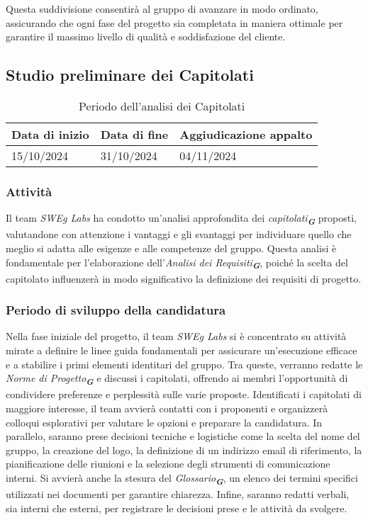 Questa suddivisione consentirà al gruppo di avanzare in modo ordinato, 
assicurando che ogni fase del progetto sia completata in maniera ottimale per garantire il massimo livello di qualità e soddisfazione del cliente.

\vspace{0.5cm}

\subsection{Studio preliminare dei Capitolati}
\begin{table}[h!]
    \centering
    \renewcommand{\arraystretch}{1.5} %
    \begin{tabularx}{\textwidth}{|X|X|X|}\hline
    \rowcolor[HTML]{FFD700} 
    \textbf{Data di inizio} & \textbf{Data di fine} & \textbf{Aggiudicazione appalto} \\ \hline
    15/10/2024 & 31/10/2024 & 04/11/2024 \\ \hline
    \end{tabularx}
    \caption{Periodo dell’analisi dei Capitolati}
\end{table}

\subsubsection{Attività}
Il team \emph{SWEg Labs} ha condotto un’analisi approfondita dei \emph{capitolati}\textsubscript{\textit{\textbf{G}}} proposti, valutandone con attenzione i vantaggi e gli svantaggi per individuare quello che meglio si adatta alle esigenze e alle competenze del gruppo. 
Questa analisi è fondamentale per l’elaborazione dell’\emph{Analisi dei Requisiti}\textsubscript{\textit{\textbf{G}}}, poiché la scelta del capitolato influenzerà in modo significativo la definizione dei requisiti di progetto.

\subsubsection{Periodo di sviluppo della candidatura}
Nella fase iniziale del progetto, il team \emph{SWEg Labs} si è concentrato su attività mirate a definire le linee guida fondamentali per assicurare un'esecuzione efficace e a stabilire i primi elementi identitari del gruppo.
Tra queste, verranno redatte le \emph{Norme di Progetto}\textsubscript{\textit{\textbf{G}}} e discussi i capitolati, offrendo ai membri l’opportunità di condividere preferenze e perplessità sulle varie proposte. Identificati i capitolati di maggiore interesse, il team avvierà contatti con i proponenti e organizzerà colloqui esplorativi per valutare le opzioni e preparare la candidatura.
In parallelo, saranno prese decisioni tecniche e logistiche come la scelta del nome del gruppo, la creazione del logo, la definizione di un indirizzo email di riferimento, la pianificazione delle riunioni e la selezione degli strumenti di comunicazione interni. Si avvierà anche la stesura del \emph{Glossario}\textsubscript{\textit{\textbf{G}}}, un elenco dei termini specifici utilizzati nei documenti per garantire chiarezza. Infine, saranno redatti verbali, sia interni che esterni, per registrare le decisioni prese e le attività da svolgere.
\newpage

